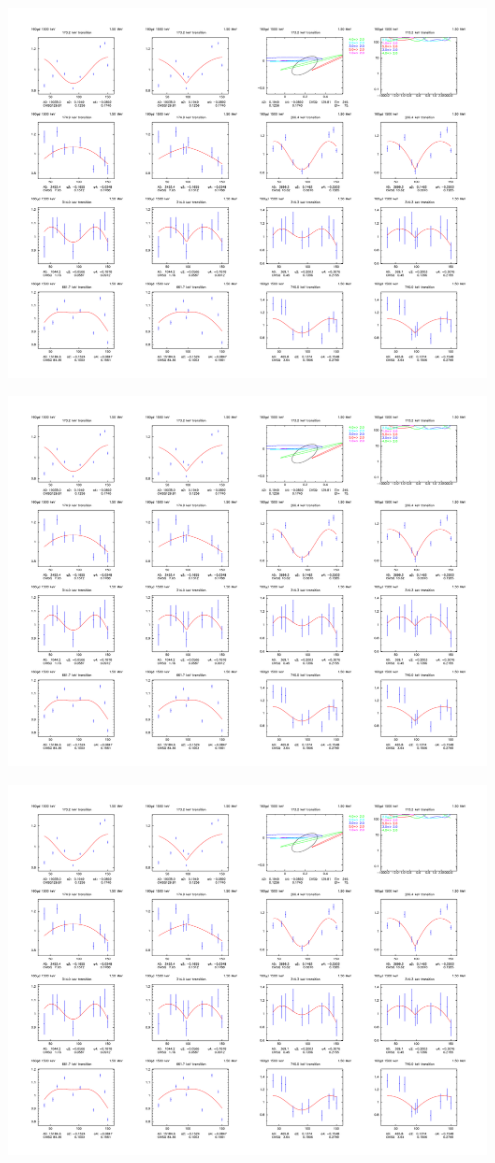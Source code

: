\begin{center}
\includegraphics[page=3,angle=90,width=0.95\textwidth]{160Gd_15_AD_2.pdf}
\end{center}
\begin{center}
\includegraphics[page=4,angle=90,width=0.95\textwidth]{160Gd_15_AD_2.pdf}
\end{center}
\begin{center}
\includegraphics[page=5,angle=90,width=0.95\textwidth]{160Gd_15_AD_2.pdf}
\end{center}
